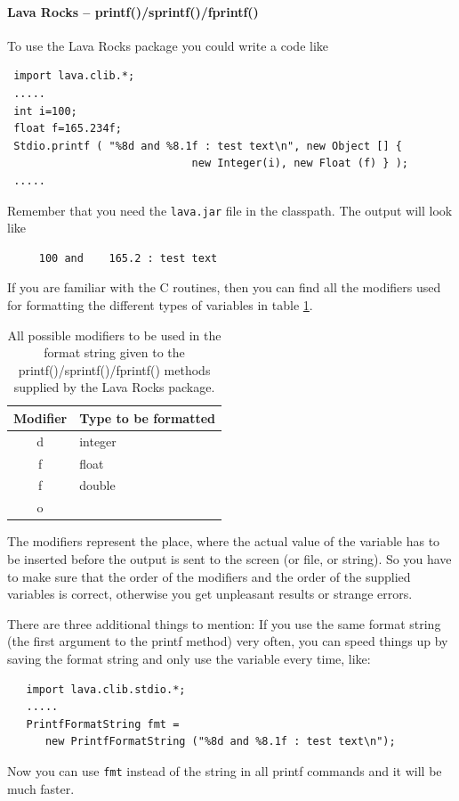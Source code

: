 \paragraph{Lava Rocks -- printf()/sprintf()/fprintf()}
To use the Lava Rocks package you could write a code like
\begin{small}
\begin{verbatim}
 import lava.clib.*;
 .....
 int i=100;
 float f=165.234f;
 Stdio.printf ( "%8d and %8.1f : test text\n", new Object [] { 
                             new Integer(i), new Float (f) } );
 .....                 
\end{verbatim}
\end{small}
Remember that you need the \verb|lava.jar| file in the classpath.
The output will look like
\begin{verbatim}
     100 and    165.2 : test text
\end{verbatim}
If you are familiar with the C routines, then you can find all
the modifiers used for formatting the different types of variables
in table \ref{tab:PrintfModifiers}.
\begin{table}[htbp]
  \begin{center}
    \begin{tabular}{cl}
      Modifier & Type to be formatted \\ \hline
      d & integer \\
      f & float \\
      f & double \\
      o & \\
    \end{tabular}
    \caption{All possible modifiers to be used in the format 
      string given to the printf()/sprintf()/fprintf() methods supplied 
      by the Lava Rocks package.}
    \label{tab:PrintfModifiers}
  \end{center}
\end{table}
The modifiers represent the place, where the actual value of the variable 
has to be inserted before the output is sent to the screen (or file, 
or string). So you have to make sure that the order of the modifiers and
the order of the supplied variables is correct, otherwise you get
unpleasant results or strange errors.

There are three additional things to mention: 
If you use the
same format string (the first argument to the printf method) 
very often, you can speed things up by saving the format string
and only use the variable every time, like:
\begin{small}
\begin{verbatim}
   import lava.clib.stdio.*;
   .....
   PrintfFormatString fmt = 
      new PrintfFormatString ("%8d and %8.1f : test text\n");
\end{verbatim}
\end{small}
Now you can use \verb|fmt| instead of the string in all printf commands
and it will be much faster.

